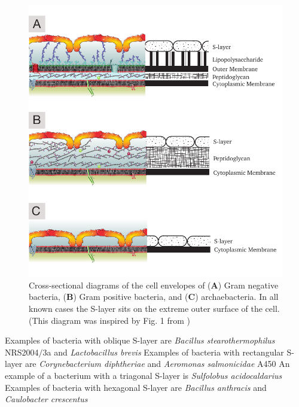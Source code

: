         \begin{figure}[p] %
                \begin{center}
                    \includegraphics[]{intro/img/celwalls.pdf}
                \end{center}
                \caption[Cross-sectional diagrams of \ac{S-layer} containing cell envelopes]{Cross-sectional diagrams of the cell envelopes of (\textbf{A}) Gram negative bacteria, (\textbf{B}) Gram positive bacteria, and (\textbf{C}) archaebacteria. In all known cases the \ac{S-layer} sits on the extreme outer surface of the cell. (This diagram was inspired by Fig. 1 from )}
                \label{fig:cellwalls}
        \end{figure}

            Examples of bacteria with oblique \acs{S-layer} are \textit{Bacillus stearothermophilus} NRS2004$/$3a and \textit{Lactobacillus brevis}
            Examples of bacteria with rectangular \acs{S-layer} are \textit{Corynebacterium diphtheriae} and \textit{Aeromonas salmonicidae} A450
            An example of a bacterium with a triagonal \ac{S-layer} is \textit{Sulfolobus acidocaldarius}
            Examples of bacteria with hexagonal \acs{S-layer} are \textit{Bacillus anthracis} and \textit{Caulobacter crescentus}

